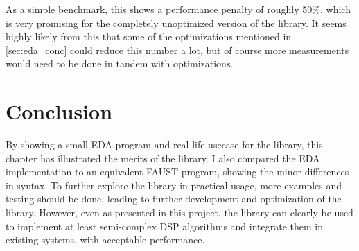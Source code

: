 As a simple benchmark, this shows a performance penalty of roughly 50\%, which is very promising for the
completely unoptimized version of the library. It seems highly likely from this that some of the
optimizations mentioned in \autoref{sec:eda_conc} could reduce this number a lot, but of course more
measurements would need to be done in tandem with optimizations.

\section{Conclusion}

By showing a small EDA program and real-life usecase for the library, this chapter has illustrated the merits
of the library. I also compared the EDA implementation to an equivalent FAUST program, showing the minor
differences in syntax. To further explore the library in practical usage, more examples and testing should be
done, leading to further development and optimization of the library. However, even as presented in this
project, the library can clearly be used to implement at least semi-complex DSP algorithms and integrate them
in existing systems, with acceptable performance.
